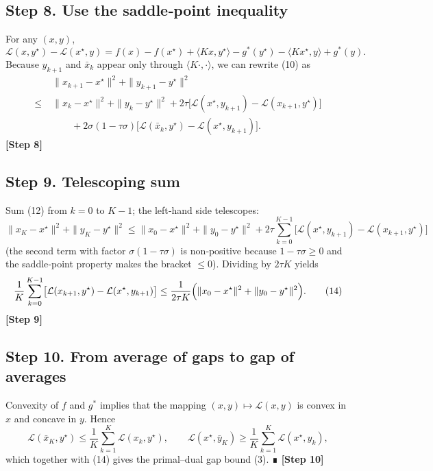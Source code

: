 \documentclass{article}
\begin{document}
\subsection*{Step 8.  Use the saddle‑point inequality}
For any $(x,y)$,
\[
\mathcal L(x,y^{\star})-\mathcal L(x^{\star},y)
= f(x)-f(x^{\star})+ \langle Kx, y^{\star}\rangle-g^{*}(y^{\star})
      -\langle Kx^{\star},y\rangle+g^{*}(y).
\]
Because $y_{k+1}$ and $\bar x_{k}$ appear only through $\langle K\cdot ,\cdot\rangle$, we can rewrite (10) as
\[
\begin{aligned}
&\|x_{k+1}-x^{\star}\|^{2}+\|y_{k+1}-y^{\star}\|^{2}\\
\le\;&\|x_{k}-x^{\star}\|^{2}+\|y_{k}-y^{\star}\|^{2}
+2\tau\bigl[\mathcal L(x^{\star},y_{k+1})-\mathcal L(x_{k+1},y^{\star})\bigr]\\
&\qquad+2\sigma(1-\tau\sigma)\bigl[\mathcal L(\bar x_{k},y^{\star})-\mathcal L(x^{\star},y_{k+1})\bigr].
\end{aligned}
\tag{12}
\]
\textbf{[Step 8]}

\subsection*{Step 9.  Telescoping sum}
Sum (12) from $k=0$ to $K-1$; the left‑hand side telescopes:
\[
\|x_{K}-x^{\star}\|^{2}+\|y_{K}-y^{\star}\|^{2}
\le \|x_{0}-x^{\star}\|^{2}+\|y_{0}-y^{\star}\|^{2}
+2\tau\sum_{k=0}^{K-1}\bigl[\mathcal L(x^{\star},y_{k+1})-\mathcal L(x_{k+1},y^{\star})\bigr]
\tag{13}
\]
(the second term with factor $\sigma(1-\tau\sigma)$ is non‑positive because $1-\tau\sigma\ge0$ and the saddle‑point property makes the bracket $\le0$).  
Dividing by $2\tau K$ yields
\[
\frac{1}{K}\sum_{k=0}^{K-1}\bigl[\mathcal L(x_{k+1},y^{\star})-\mathcal L(x^{\star},y_{k+1})\bigr]
\le\frac{1}{2\tau K}\Bigl(\|x_{0}-x^{\star}\|^{2}+\|y_{0}-y^{\star}\|^{2}\Bigr).
\tag{14}
\]
\textbf{[Step 9]}

\subsection*{Step 10.  From average of gaps to gap of averages}
Convexity of $f$ and $g^{*}$ implies that the mapping $(x,y)\mapsto\mathcal L(x,y)$ is convex in $x$ and concave in $y$. Hence
\[
\mathcal L(\bar x_{K},y^{\star})\le\frac{1}{K}\sum_{k=1}^{K}\mathcal L(x_{k},y^{\star}),
\qquad
\mathcal L(x^{\star},\bar y_{K})\ge\frac{1}{K}\sum_{k=1}^{K}\mathcal L(x^{\star},y_{k}),
\]
which together with (14) gives the primal–dual gap bound (3). ∎
\textbf{[Step 10]}
\end{document}
